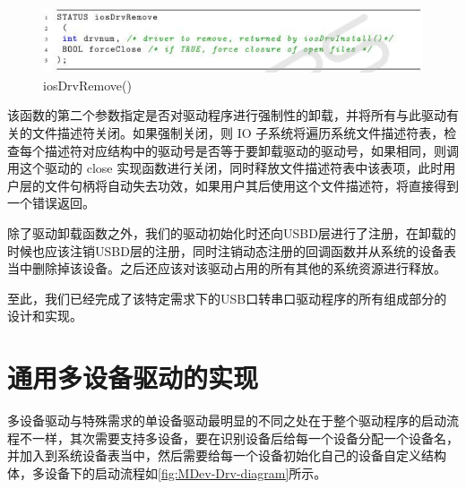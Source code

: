 \begin{figure}[!h]
\centering
\includegraphics[width=1.0\textwidth]{./graphics/iosDrvRemove.pdf}
\caption{iosDrvRemove()}\label{fig:iosDrvRemove}
\end{figure}

该函数的第二个参数指定是否对驱动程序进行强制性的卸载，并将所有与此驱动有关的文件描述符关闭。如果强制关闭，则 IO 子系统将遍历系统文件描述符表，检查每个描述符对应结构中的驱动号是否等于要卸载驱动的驱动号，如果相同，则调用这个驱动的 close 实现函数进行关闭，同时释放文件描述符表中该表项，此时用户层的文件句柄将自动失去功效，如果用户其后使用这个文件描述符，将直接得到一个错误返回。

除了驱动卸载函数之外，我们的驱动初始化时还向USBD层进行了注册，在卸载的时候也应该注销USBD层的注册，同时注销动态注册的回调函数并从系统的设备表当中删除掉该设备。之后还应该对该驱动占用的所有其他的系统资源进行释放。



至此，我们已经完成了该特定需求下的USB口转串口驱动程序的所有组成部分的设计和实现。

\section{通用多设备驱动的实现}
	多设备驱动与特殊需求的单设备驱动最明显的不同之处在于整个驱动程序的启动流程不一样，其次需要支持多设备，要在识别设备后给每一个设备分配一个设备名，并加入到系统设备表当中，然后需要给每一个设备初始化自己的设备自定义结构体，多设备下的启动流程如\autoref{fig:MDev-Drv-diagram}所示。

